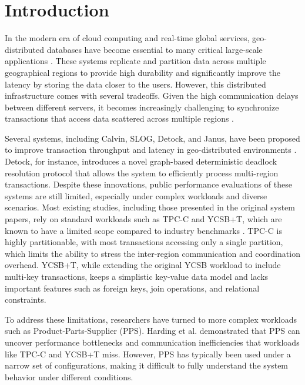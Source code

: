 \section{Introduction}
\label{sec: introduction}

In the modern era of cloud computing and real-time global services, geo-distributed databases have become essential to many critical large-scale applications \cite{corbett2013spanner, bronson2013tao}. These systems replicate and partition data across multiple geographical regions to provide high durability and significantly improve the latency by storing the data closer to the users. However, this distributed infrastructure comes with several tradeoffs. Given the high communication delays between different servers, it becomes increasingly challenging to synchronize transactions that access data scattered across multiple regions \cite{bailis2013highly}.

Several systems, including Calvin, SLOG, Detock, and Janus, have been proposed to improve transaction throughput and latency in geo-distributed environments \cite{thomson2012calvin, ren2019slog, nguyen2023detock, mu2016consolidating}. Detock, for instance, introduces a novel graph-based deterministic deadlock resolution protocol that allows the system to efficiently process multi-region transactions. Despite these innovations, public performance evaluations of these systems are still limited, especially under complex workloads and diverse scenarios. Most existing studies, including those presented in the original system papers, rely on standard workloads such as TPC-C and YCSB+T, which are known to have a limited scope compared to industry benchmarks \cite{leutenegger1993modeling, tozun2013analyzing, dey2014ycsb+}. TPC-C is highly partitionable, with most transactions accessing only a single partition, which limits the ability to stress the inter-region communication and coordination overhead. YCSB+T, while extending the original YCSB workload to include multi-key transactions, keeps a simplistic key-value data model and lacks important features such as foreign keys, join operations, and relational constraints.

To address these limitations, researchers have turned to more complex workloads such as Product-Parts-Supplier (PPS). Harding et al.\cite{harding2017evaluation} demonstrated that PPS can uncover performance bottlenecks and communication inefficiencies that workloads like TPC-C and YCSB+T miss. However, PPS has typically been used under a narrow set of configurations, making it difficult to fully understand the system behavior under different conditions.

